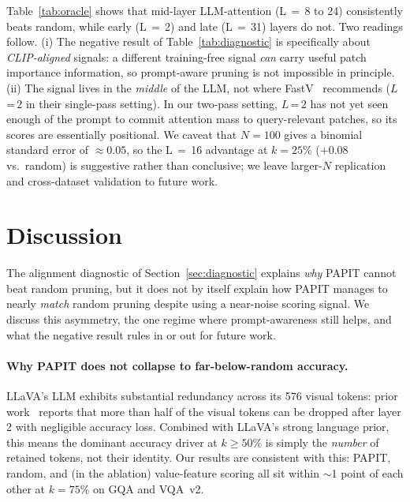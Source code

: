 \documentclass[10pt,twocolumn,letterpaper]{article}
\begin{document}
Table~\ref{tab:oracle} shows that mid-layer LLM-attention (L\,$=$\,8 to
24) consistently beats random, while early (L\,$=$\,2) and late
(L\,$=$\,31) layers do not. Two readings follow. (i) The negative
result of Table~\ref{tab:diagnostic} is specifically about
\emph{CLIP-aligned} signals: a different training-free signal
\emph{can} carry useful patch importance information, so prompt-aware
pruning is not impossible in principle. (ii) The signal lives in the
\emph{middle} of the LLM, not where FastV~\cite{chen2024fastv} recommends
($L\,$=$\,2$ in their single-pass setting). In our two-pass setting,
$L\,$=$\,2$ has not yet seen enough of the prompt to commit attention
mass to query-relevant patches, so its scores are essentially
positional. We caveat that $N\!=\!100$ gives a binomial standard
error of $\approx 0.05$, so the L\,$=$\,16 advantage at $k\!=\!25\%$
($+0.08$ vs.\ random) is suggestive rather than conclusive; we leave
larger-$N$ replication and cross-dataset validation to future work.

\section{Discussion}
\label{sec:discussion}

The alignment diagnostic of Section~\ref{sec:diagnostic} explains
\emph{why} PAPIT cannot beat random pruning, but it does not by
itself explain how PAPIT manages to nearly \emph{match} random
pruning despite using a near-noise scoring signal. We discuss this
asymmetry, the one regime where prompt-awareness still helps, and
what the negative result rules in or out for future work.

\paragraph{Why PAPIT does not collapse to far-below-random accuracy.}
LLaVA's LLM exhibits substantial redundancy across its 576 visual
tokens: prior work~\cite{chen2024fastv} reports that more than half
of the visual tokens can be dropped after layer 2 with negligible
accuracy loss. Combined with LLaVA's strong language prior, this
means the dominant accuracy driver at $k\!\geq\!50\%$ is simply the
\emph{number} of retained tokens, not their identity. Our results
are consistent with this: PAPIT, random, and (in the ablation)
value-feature scoring all sit within $\sim$1 point of each other at
$k{=}75\%$ on GQA and VQA~v2.
\end{document}
